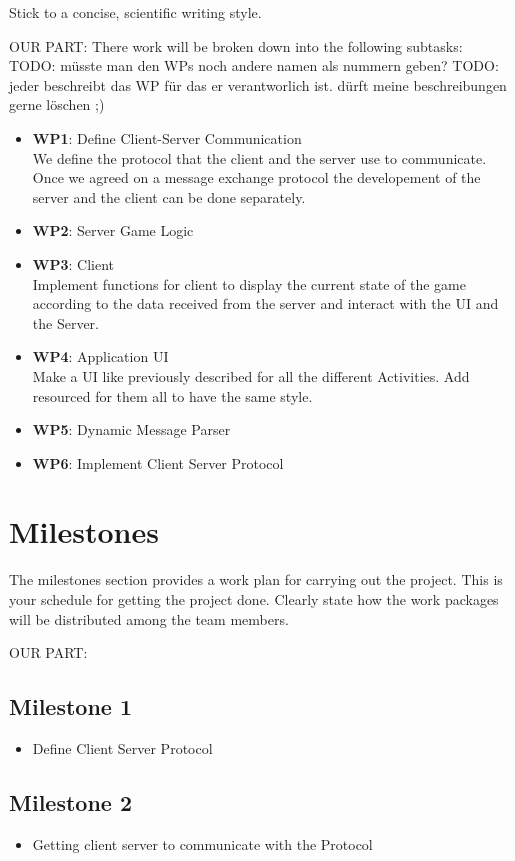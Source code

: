 \documentclass{report}
\begin{document}
Stick to a concise, scientific writing style. 

OUR PART:
There work will be broken down into the following subtasks:
TODO: müsste man den WPs noch andere namen als nummern geben?
TODO: jeder beschreibt das WP für das er verantworlich ist. dürft meine beschreibungen gerne löschen ;)
\begin{itemize}
        \item {\bf WP1}: Define Client-Server Communication\\
        We define the protocol that the client and the server use to communicate. Once we agreed on a message exchange protocol the developement of the server and the client can be done separately.
        \item {\bf WP2}: Server Game Logic\\
        
           
        \item {\bf WP3}: Client\\
	Implement functions for client to display the current state of the game according to the data received from the server and interact with the UI and the Server.
	\item {\bf WP4}: Application UI\\
	Make a UI like previously described for all the different Activities.
Add resourced for them all to have the same style.
        \item {\bf WP5}: Dynamic Message Parser
        \item {\bf WP6}: Implement Client Server Protocol
\end{itemize}

\section{Milestones}
The milestones section provides a work plan for carrying out the project.
This is your schedule for getting the project done.
Clearly state how the work packages will be distributed among the team members. 

OUR PART:

\subsection{Milestone 1}
\begin{itemize}
	\item Define Client Server Protocol
\end{itemize}

\subsection{Milestone 2}
\begin{itemize}
	\item Getting client server to communicate with the Protocol
\end{itemize}
\end{document}
